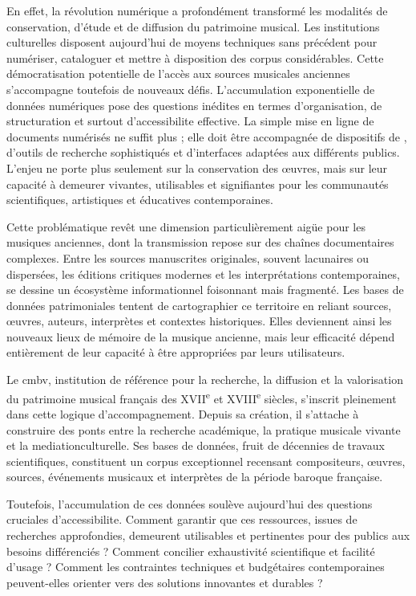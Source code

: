 En effet, la révolution numérique a profondément transformé les modalités de conservation, d'étude et de diffusion du patrimoine musical. Les institutions culturelles disposent aujourd'hui de moyens techniques sans précédent pour numériser, cataloguer et mettre à disposition des corpus considérables. Cette démocratisation potentielle de l'accès aux sources musicales anciennes s'accompagne toutefois de nouveaux défis. L'accumulation exponentielle de données numériques pose des questions inédites en termes d'organisation, de structuration et surtout d'\gls{accessibilite} effective. La simple mise en ligne de documents numérisés ne suffit plus ; elle doit être accompagnée de dispositifs de , d'outils de recherche sophistiqués et d'interfaces adaptées aux différents publics. L'enjeu ne porte plus seulement sur la conservation des œuvres, mais sur leur capacité à demeurer vivantes, utilisables et signifiantes pour les communautés scientifiques, artistiques et éducatives contemporaines.

Cette problématique revêt une dimension particulièrement aigüe pour les musiques anciennes, dont la transmission repose sur des chaînes documentaires complexes. Entre les sources manuscrites originales, souvent lacunaires ou dispersées, les éditions critiques modernes et les interprétations contemporaines, se dessine un écosystème informationnel foisonnant mais fragmenté. Les bases de données patrimoniales tentent de cartographier ce territoire en reliant sources, œuvres, auteurs, interprètes et contextes historiques. Elles deviennent ainsi les nouveaux lieux de mémoire de la musique ancienne, mais leur efficacité dépend entièrement de leur capacité à être appropriées par leurs utilisateurs.

Le \gls{cmbv}, institution de référence pour la recherche, la diffusion et la valorisation du patrimoine musical français des XVII\textsuperscript{e} et XVIII\textsuperscript{e} siècles, s'inscrit pleinement dans cette logique d'accompagnement. Depuis sa création, il s'attache à construire des ponts entre la recherche académique, la pratique musicale vivante et la \gls{mediationculturelle}. Ses bases de données, fruit de décennies de travaux scientifiques, constituent un corpus exceptionnel recensant compositeurs, œuvres, sources, événements musicaux et interprètes de la période baroque française.

Toutefois, l'accumulation de ces données soulève aujourd'hui des questions cruciales d'\gls{accessibilite}. Comment garantir que ces ressources, issues de recherches approfondies, demeurent utilisables et pertinentes pour des publics aux besoins différenciés ? Comment concilier exhaustivité scientifique et facilité d'usage ? Comment les contraintes techniques et budgétaires contemporaines peuvent-elles orienter vers des solutions innovantes et durables ?

